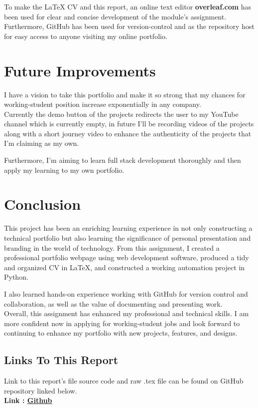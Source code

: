 \documentclass{report}
\begin{document}
To make the LaTeX CV and this report, an online text editor {\bf overleaf.com} has been used for clear and concise development of the module's assignment.\\
Furthermore, GitHub has been used for version-control and as the repository host for easy access to anyone visiting my online portfolio.

\chapter{Future Improvements}
I have a vision to take this portfolio and make it so strong that my chances for working-student position increase exponentially in any company.\\
Currently the demo button of the projects redirects the user to my YouTube channel which is currently empty, in future I'll be recording videos of the projects along with a short journey video to enhance the authenticity of the projects that I'm claiming as my own.\\ \par
Furthermore, I'm aiming to learn full stack development thoroughly and then apply my learning to my own portfolio. 


\chapter{Conclusion}
This project has been an enriching learning experience in not only constructing a technical portfolio but also learning the significance of personal presentation and branding in the world of technology. From this assignment, I created a professional portfolio webpage using web development software, produced a tidy and organized CV in LaTeX, and constructed a working automation project in Python.\\ \par

I also learned hands-on experience working with GitHub for version control and collaboration, as well as the value of documenting and presenting work. 
\\
Overall, this assignment has enhanced my professional and technical skills. I am more confident now in applying for working-student jobs and look forward to continuing to enhance my portfolio with new projects, features, and designs. \\ \par

\section{Links To This Report}
Link to this report's file source code and raw .tex file can be found on GitHub repository linked below. \\
{\bf Link : \href{https://github.com/tusharrbhardwaj/CS-Lab-Report}{\color{blue}Github}}\\




\end{document}
